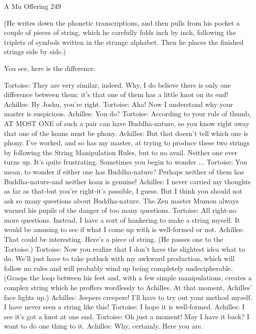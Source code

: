 A Mu Offering                                                                          249

   (He writes down the phonetic transcriptions, and then pulls from his pocket a
   couple of pieces of string, which he carefully folds inch by inch, following the
   triplets of symbols written in the strange alphabet. Then he places the finished
   strings side by side.)

You see, here is the difference.

Tortoise: They are very similar, indeed. Why, I do believe there is only one difference
   between them: it's that one of them has a little knot on its end!
Achilles: By Joshu, you're right.
Tortoise: Aha! Now I understand why your master is suspicious.
Achilles: You do?
Tortoise: According to your rule of thumb, AT MOST ONE of such a pair can have
   Buddha-nature, so you know right away that one of the koans must be phony.
Achilles: But that doesn't tell which one is phony. I've worked, and so has my master, at
   trying to produce these two strings by following the String Manipulation Rules, but to
   no avail. Neither one ever turns up. It's quite frustrating. Sometimes you begin to
   wonder ...
Tortoise: You mean, to wonder if either one has Buddha-nature? Perhaps neither of them
   has Buddha-nature-and neither koan is genuine!
Achilles: I never carried my thoughts as far as that-but you're right-it's possible, I guess.
   But I think you should not ask so many questions about Buddha-nature. The Zen
   master Mumon always warned his pupils of the danger of too many questions.
Tortoise: All right-no more questions. Instead, I have a sort of hankering to make a string
   myself. It would be amusing to see if what I come up with is well-formed or not.
Achilles: That could be interesting. Here's a piece of string. (He passes one to the
   Tortoise.)
Tortoise: Now you realize that I don't have the slightest idea what to do.
We'll just have to take potluck with my awkward production, which will follow no rules
   and will probably wind up being completely undecipherable. (Grasps the loop
   between his feet and, with a few simple manipulations, creates a complex string which
   he proffers wordlessly to Achilles. At that moment, Achilles' face lights up.)
Achilles: Jeepers creepers! I'll have to try out your method myself. I have never seen a
   string like this!
Tortoise: I hope it is well-formed. Achilles: I see it's got a knot at one end.
Tortoise: Oh just a moment! May I have it back? I want to do one thing to it.
Achilles: Why, certainly. Here you are.

